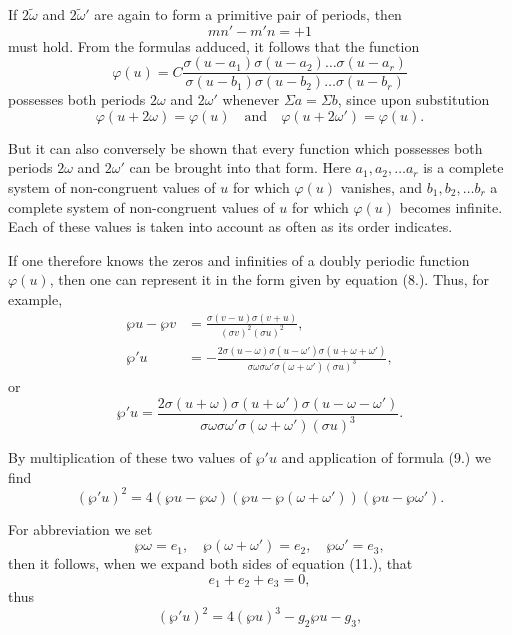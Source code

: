 \documentclass[12pt]{article}
\begin{document}

If $2\tilde{\omega}$ and $2\tilde{\omega}'$ are again to form a primitive pair of periods, then
\begin{equation*}
mn' - m'n = +1
\end{equation*}
must hold.
From the formulas adduced, it follows that the function
\begin{equation}
\varphi(u) = C \frac{\sigma(u-a_1)\sigma(u-a_2)\dots\sigma(u-a_r)}{\sigma(u-b_1)\sigma(u-b_2)\dots\sigma(u-b_r)}
\end{equation}
possesses both periods $2\omega$ and $2\omega'$ whenever $\Sigma a = \Sigma b$, since upon substitution
\begin{equation*}
\varphi(u+2\omega) = \varphi(u) \quad \text{and} \quad \varphi(u+2\omega') = \varphi(u).
\end{equation*}

But it can also conversely be shown that every function which possesses both periods $2\omega$ and $2\omega'$ can be brought into that form. Here $a_1, a_2, \dots a_r$ is a complete system of non-congruent values of $u$ for which $\varphi(u)$ vanishes, and $b_1, b_2, \dots b_r$ a complete system of non-congruent values of $u$ for which $\varphi(u)$ becomes infinite. Each of these values is taken into account as often as its order indicates.

If one therefore knows the zeros and infinities of a doubly periodic function $\varphi(u)$, then one can represent it in the form given by equation (8.). Thus, for example,
\begin{align}
\wp u - \wp v &= \frac{\sigma(v-u)\sigma(v+u)}{(\sigma v)^2 (\sigma u)^2},\\
\wp' u &= -\frac{2\sigma(u-\omega)\sigma(u-\omega')\sigma(u+\omega+\omega')}{\sigma\omega\sigma\omega'\sigma(\omega+\omega')(\sigma u)^3},
\end{align}
or
\begin{equation}
\tag{10$^a$.} \wp' u = \frac{2\sigma(u+\omega)\sigma(u+\omega')\sigma(u-\omega-\omega')}{\sigma\omega\sigma\omega'\sigma(\omega+\omega')(\sigma u)^3}.
\end{equation}

By multiplication of these two values of $\wp' u$ and application of formula (9.) we find
\begin{equation}
(\wp' u)^2 = 4(\wp u - \wp\omega)(\wp u - \wp(\omega+\omega'))(\wp u - \wp\omega').
\end{equation}

For abbreviation we set
\begin{equation*}
\wp\omega = e_1, \quad \wp(\omega+\omega') = e_2, \quad \wp\omega' = e_3,
\end{equation*}
then it follows, when we expand both sides of equation (11.), that
\begin{equation*}
e_1 + e_2 + e_3 = 0,
\end{equation*}
thus
\begin{equation}
(\wp' u)^2 = 4(\wp u)^3 - g_2\wp u - g_3,
\end{equation}
\end{document}
